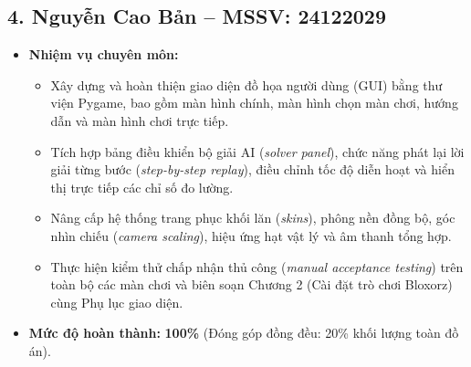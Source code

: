 \subsection*{4. Nguyễn Cao Bản -- MSSV: 24122029}
\begin{itemize}
    \item \textbf{Nhiệm vụ chuyên môn:}
    \begin{itemize}
        \item Xây dựng và hoàn thiện giao diện đồ họa người dùng (GUI) bằng thư viện Pygame, bao gồm màn hình chính, màn hình chọn màn chơi, hướng dẫn và màn hình chơi trực tiếp.
        \item Tích hợp bảng điều khiển bộ giải AI (\textit{solver panel}), chức năng phát lại lời giải từng bước (\textit{step-by-step replay}), điều chỉnh tốc độ diễn hoạt và hiển thị trực tiếp các chỉ số đo lường.
        \item Nâng cấp hệ thống trang phục khối lăn (\textit{skins}), phông nền đồng bộ, góc nhìn chiếu (\textit{camera scaling}), hiệu ứng hạt vật lý và âm thanh tổng hợp.
        \item Thực hiện kiểm thử chấp nhận thủ công (\textit{manual acceptance testing}) trên toàn bộ các màn chơi và biên soạn Chương 2 (Cài đặt trò chơi Bloxorz) cùng Phụ lục giao diện.
    \end{itemize}
    \item \textbf{Mức độ hoàn thành:} \textbf{100\%} (Đóng góp đồng đều: 20\% khối lượng toàn đồ án).
\end{itemize}

